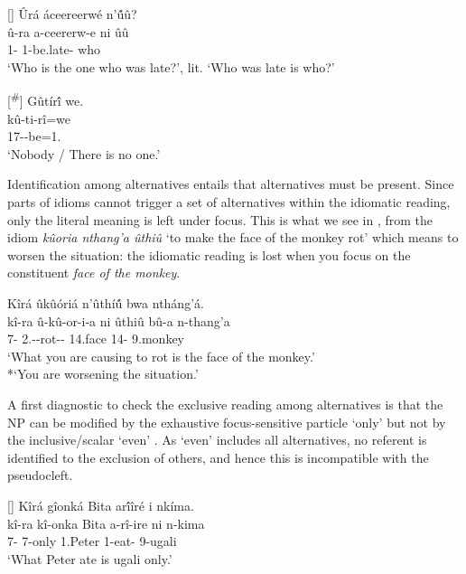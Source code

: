 \documentclass[output=paper]{langscibook}
\begin{document}
\z

\ex
\label{bkm:Ref111806765}

\ea
[]{
Ûrá áceereerwé n’û́û?\\
\gll
û-ra  a-ceererw-e  ni  ûû\\
1-\RM{} 1\SM{}-be.late-\PFV{} \COP{} who\\
\glt
‘Who is the one who was late?’, lit. ‘Who was late is who?’
}

\ex
[\textsuperscript{\#}]{
Gûtír\'{î} we.\\
\gll
kû-ti-rî=we\\
17\SM-\NEG{}-be=1.\PRO{}\\
\glt
‘Nobody / There is no one.’
}

\z
\z

Identification among alternatives entails that alternatives must be present. Since parts of idioms cannot trigger a set of alternatives within the idiomatic reading, only the literal meaning is left under focus. This is what we see in , from the idiom \textit{kûoria nthang’a ûthiû} ‘to make the face of the monkey rot’ which means to worsen the situation: the idiomatic reading is lost when you focus on the constituent \textit{face of the monkey}.\largerpage[-1]\pagebreak

\ea
\label{bkm:Ref120111763}
Kîrá ûkûóriá n’ûthí\'{û} bwa ntháng’á.\\
\gll
kî-ra  û-kû-or-i-a  ni  ûthiû  bû-a  n-thang’a\\
7-\RM{} 2\SG.\SM-\PRS{}-rot-\IC-\FV{} \COP{} 14.face  14-\CONN{} 9.monkey\\
\glt
‘What you are causing to rot is the face of the monkey.’\\
*`You are worsening the situation.’

\z


A first diagnostic to check the exclusive reading among alternatives is that the NP can be modified by the exhaustive focus-sensitive particle ‘only’  but not by the inclusive/scalar ‘even’ . As ‘even’ includes all alternatives, no referent is identified to the exclusion of others, and hence this is incompatible with the pseudocleft.

\ea
[]{
\label{bkm:Ref111981556}
Kîrá gîonká Bita ar\'{î}îré i nkíma.\\
\gll
kî-ra  kî-onka  Bita  a-rî-ire  ni  n-kima\\
7-\RM{} 7-only  1.Peter  1\SM{}-eat-\PFV{} \COP{} 9-ugali\\
\glt
‘What Peter ate is ugali only.’
}
\end{document}

